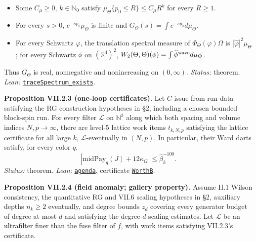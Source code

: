 \documentclass[
  letterpaper,
  11pt]{article}
\providecommand{\tightlist}{%
  \setlength{\itemsep}{0pt}\setlength{\parskip}{0pt}}
\begin{document}
\begin{itemize}
\tightlist
\item
  Some \(C_\mu\ge0\), \(k\in\mathbb N_0\) satisfy
  \(\mu_\Theta\{p_0\le R\}\le C_\mu R^k\) for every \(R\ge1\).
\item
  For every \(s>0\), \(e^{-sp_0}\mu_\Theta\) is finite and
  \(G_\Theta(s)=\int e^{-sp_0}d\mu_\Theta\).
\item
  For every Schwartz \(\varphi\), the translation spectral measure of
  \(\Phi_\Theta(\varphi)\Omega\) is \(|\hat\varphi|^2\mu_\Theta\); for
  every Schwartz \(\phi\) on \((\mathbb R^4)^2\),
  \(W_2(\Theta,\Theta)(\phi)=\int\widehat\phi^{\rm wave}d\mu_\Theta\).
\end{itemize}

Thus \(G_\Theta\) is real, nonnegative and nonincreasing on
\((0,\infty)\). \emph{Status:} theorem. \emph{Lean:}
\href{https://github.com/yang-mills-group/OpenAI-YM-20261028/blob/3456e5e75cf8d4cd558955a5c7638fba2d68f464/YM/TraceExtension/WilsonTrace.lean\#L99-L119}{\texttt{traceSpectrum\_exists}}.

\textbf{Proposition VII.2.3 (one-loop certificates).} Let \(C\) issue
from run data satisfying the RG construction hypotheses in §2, including
a chosen bounded block-spin run. For every filter \(\mathcal L\) on
\(\mathbb N^2\) along which both spacing and volume indices
\(N,p\to\infty\), there are level-5 lattice work items \(t_{k,N,p}\)
satisfying the lattice certificate for all large \(k\),
\(\mathcal L\)-eventually in \((N,p)\). In particular, their Ward darts
satisfy, for every color \(q\),
\[|\mathrm{midPay}_q(J)+12\kappa_G|\le\hat\beta_k^{-100}.\]
\emph{Status:} theorem. \emph{Lean:}
\href{https://github.com/yang-mills-group/OpenAI-YM-20261028/blob/3456e5e75cf8d4cd558955a5c7638fba2d68f464/YM/TraceExtension/Margin/Stand.lean\#L23-L35}{\texttt{agenda}},
certificate
\href{https://github.com/yang-mills-group/OpenAI-YM-20261028/blob/3456e5e75cf8d4cd558955a5c7638fba2d68f464/YM/TraceExtension/Margin/Ansel.lean\#L30-L40}{\texttt{WorthB}}.

\textbf{Proposition VII.2.4 (field anomaly; gallery property).} Assume
II.1 Wilson consistency, the quantitative RG and VII.6 scaling
hypotheses in §2, auxiliary depths \(n_k\ge2\) eventually, and degree
bounds \(z_d\) covering every generator budget of degree at most \(d\)
and satisfying the degree-\(d\) scaling estimates. Let \(\mathcal L\) be
an ultrafilter finer than the fuse filter of \(f\), with work items
satisfying VII.2.3's certificate.
\end{document}
